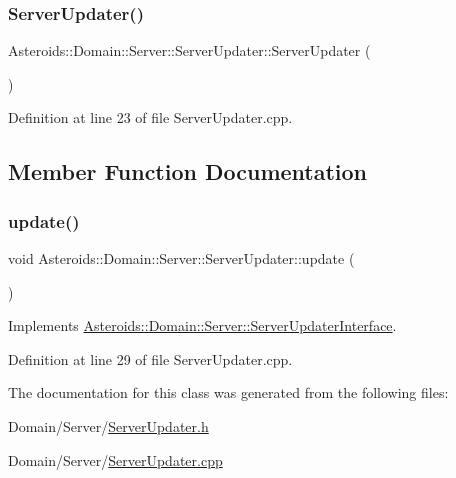 \subsubsection{\texorpdfstring{Server\+Updater()}{ServerUpdater()}}
{\footnotesize\ttfamily Asteroids\+::\+Domain\+::\+Server\+::\+Server\+Updater\+::\+Server\+Updater (\begin{DoxyParamCaption}{ }\end{DoxyParamCaption})}



Definition at line 23 of file Server\+Updater.\+cpp.



\subsection{Member Function Documentation}
\mbox{\label{classAsteroids_1_1Domain_1_1Server_1_1ServerUpdater_a9f4250008b2c855699c59945890e88cd}} 
\subsubsection{\texorpdfstring{update()}{update()}}
{\footnotesize\ttfamily void Asteroids\+::\+Domain\+::\+Server\+::\+Server\+Updater\+::update (\begin{DoxyParamCaption}{ }\end{DoxyParamCaption})\hspace{0.3cm}{\ttfamily [virtual]}}



Implements \hyperlink{classAsteroids_1_1Domain_1_1Server_1_1ServerUpdaterInterface_a361160b4683c46d96833943873de0c2c}{Asteroids\+::\+Domain\+::\+Server\+::\+Server\+Updater\+Interface}.



Definition at line 29 of file Server\+Updater.\+cpp.



The documentation for this class was generated from the following files\+:\begin{DoxyCompactItemize}
\item 
Domain/\+Server/\hyperlink{ServerUpdater_8h}{Server\+Updater.\+h}\item 
Domain/\+Server/\hyperlink{ServerUpdater_8cpp}{Server\+Updater.\+cpp}\end{DoxyCompactItemize}
